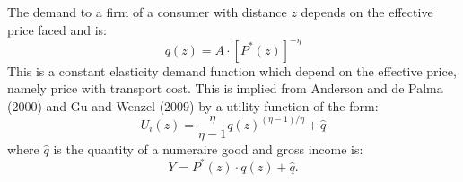 The demand to a firm of a consumer with distance $z$ depends on the effective price faced and is:
\begin{equation}
q(z)=A \cdot\left[P^*(z)\right]^{-\eta}
\end{equation}
This is a constant elasticity demand function which depend on the effective price, namely price with transport cost. This is implied from  Anderson and de Palma (2000) and Gu and Wenzel (2009) by a utility function of the form:
\begin{equation}
U_i(z)=\frac{\eta}{\eta-1} q(z)^{(\eta-1) / \eta}+\hat{q}
\end{equation}
where $\hat{q}$ is the quantity of a numeraire good and gross income is:
\begin{equation}
Y=P^*(z) \cdot q(z)+\hat{q}.
\end{equation}


